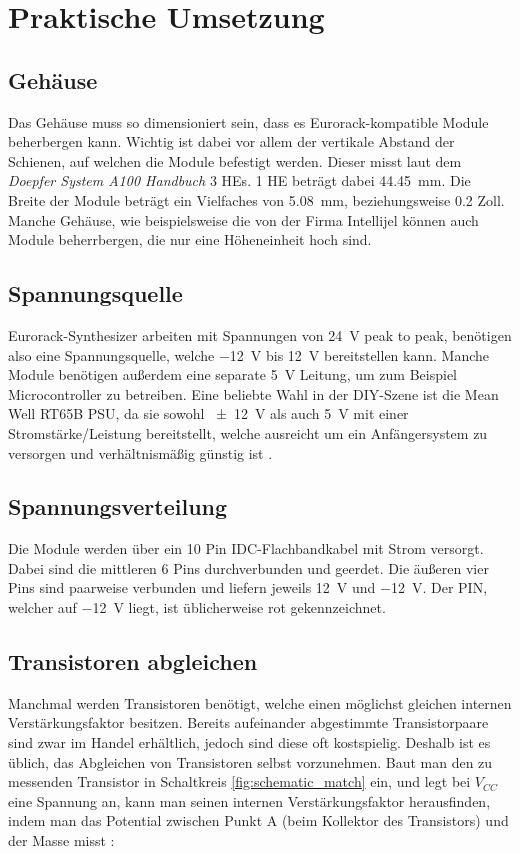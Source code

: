 \chapter{Praktische Umsetzung}

\section{Gehäuse}
\label{sec:orgf95e159}
Das Gehäuse muss so dimensioniert sein, dass es Eurorack-kompatible Module beherbergen kann. Wichtig ist dabei vor allem der vertikale Abstand der Schienen, auf welchen die Module befestigt werden. Dieser misst laut dem \emph{Doepfer System A100 Handbuch} \cite{doepfer:A-100} 3 \acp{HE}. 1 \ac{HE} beträgt dabei \SI{44.45}{\milli\meter}. Die Breite der Module beträgt ein Vielfaches von \SI{5.08}{\milli\meter}, beziehungsweise 0.2 Zoll. Manche Gehäuse, wie beispielsweise die von der Firma Intellijel können auch Module beherrbergen, die nur eine Höheneinheit hoch sind.

\section{Spannungsquelle}
\label{sec:org286c243}
Eurorack-Synthesizer arbeiten mit Spannungen von \SI{24}{\volt} peak to peak, benötigen also eine Spannungsquelle, welche \SI{-12}{\volt} bis \SI{+12}{\volt} bereitstellen kann. Manche Module benötigen außerdem eine separate \SI{5}{\volt} Leitung, um zum Beispiel Microcontroller zu betreiben. Eine beliebte Wahl in der DIY-Szene ist die Mean Well RT65B PSU, da sie sowohl \SI{\pm 12}{\volt} als auch \SI{5}{\volt} mit einer Stromstärke/Leistung bereitstellt, welche ausreicht um ein Anfängersystem zu versorgen und verhältnismäßig günstig ist \cite{modularsynthlab:rt65b}.

\section{Spannungsverteilung}
\label{sec:orgcf7b54a}
Die Module werden über ein 10 Pin IDC-Flachbandkabel mit Strom versorgt. Dabei sind die mittleren 6 Pins durchverbunden und geerdet. Die äußeren vier Pins sind paarweise verbunden und liefern jeweils \SI{+12}{\volt} und \SI{-12}{\volt}. Der PIN, welcher auf \SI{-12}{\volt} liegt, ist üblicherweise rot gekennzeichnet.

\section{Transistoren abgleichen \label{Match_Transistors}}
\label{sec:orga881cef}
Manchmal werden Transistoren benötigt, welche einen möglichst gleichen internen Verstärkungsfaktor besitzen. Bereits aufeinander abgestimmte Transistorpaare sind zwar im Handel erhältlich, jedoch sind diese oft kostspielig. Deshalb ist es üblich, das Abgleichen von Transistoren selbst vorzunehmen. Baut man den zu messenden Transistor in Schaltkreis \ref{fig:schematic_match} ein, und legt bei \(V_{CC}\) eine Spannung an, kann man seinen internen Verstärkungsfaktor herausfinden, indem man das Potential zwischen Punkt A (beim Kollektor des Transistors) und der Masse misst \cite{match_transistors}:


